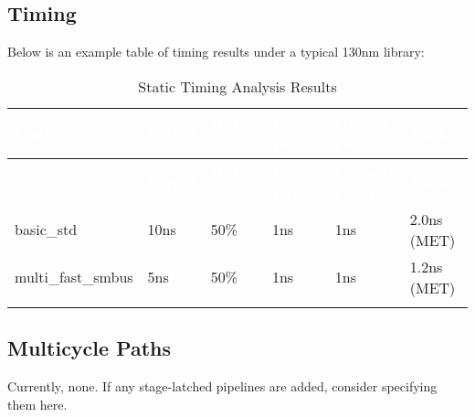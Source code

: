 \subsection{Timing}
Below is an example table of timing results under a typical 130nm library:

\renewcommand*{\arraystretch}{1.4}
\begin{longtable}[H]{
    | p{}
    | p{}
    | p{}
    | p{}
    | p{}
    | p{} |
  }
  \hline
  \rowcolor{black}
  \textcolor{white}{\textbf{Config}} &
  \textcolor{white}{\textbf{Period}} &
  \textcolor{white}{\textbf{Duty Cycle}} &
  \textcolor{white}{\textbf{Input Delay}} &
  \textcolor{white}{\textbf{Output Delay}} &
  \textcolor{white}{\textbf{Slack}} \\ 
  \hline \hline
  \endfirsthead

  \rowcolor{black}
  \textcolor{white}{\textbf{Config}} &
  \textcolor{white}{\textbf{Period}} &
  \textcolor{white}{\textbf{Duty Cycle}} &
  \textcolor{white}{\textbf{Input Delay}} &
  \textcolor{white}{\textbf{Output Delay}} &
  \textcolor{white}{\textbf{Slack}} \\ 
  \hline \hline
  \endhead

  \hline
  \endfoot

basic\_std &
10ns &
50\% &
1ns &
1ns &
2.0ns (MET) \\ \hline

multi\_fast\_smbus &
5ns &
50\% &
1ns &
1ns &
1.2ns (MET) \\ \hline

\caption{Static Timing Analysis Results}
\label{table:timing}
\end{longtable}

\subsection{Multicycle Paths}
Currently, none. If any stage-latched pipelines are added, consider specifying them here.
